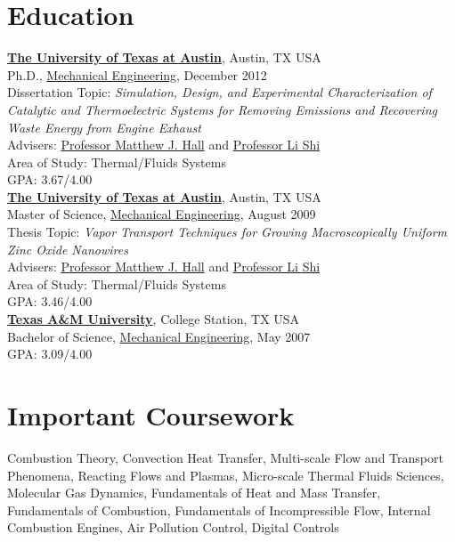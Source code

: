 \documentclass[centered]{res}
\begin{document}
\begin{resume}
\section{Education}
%
\href{http://www.utexas.edu/}{\textbf{The University of Texas at
    Austin}}, Austin, TX USA \\
Ph.D., \href{http://www.me.utexas.edu/}{Mechanical Engineering},
December 2012 \\
Dissertation Topic: \emph{Simulation, Design, and Experimental Characterization of
  Catalytic and Thermoelectric Systems for Removing Emissions and
  Recovering Waste Energy from Engine Exhaust} \\
Advisers:
\href{http://www.me.utexas.edu/directory/faculty/hall/matthew/33/}{Professor
  Matthew J. Hall} and \href{http://www.me.utexas.edu/~lishi/}{Professor Li Shi}\\
Area of Study: Thermal/Fluids Systems \\
GPA: 3.67/4.00 \\
%
\href{http://www.utexas.edu/}{\textbf{The University of Texas at
    Austin}}, Austin, TX USA \\
Master of Science, \href{http://www.me.utexas.edu/}{Mechanical
  Engineering}, August 2009 \\
Thesis Topic: \emph{Vapor Transport Techniques for Growing
  Macroscopically Uniform Zinc Oxide Nanowires} \\
Advisers:
\href{http://www.me.utexas.edu/directory/faculty/hall/matthew/33/}{Professor
  Matthew J. Hall} and \href{http://www.me.utexas.edu/~lishi/}{Professor Li Shi}\\
Area of Study: Thermal/Fluids Systems \\
GPA: 3.46/4.00\\
%
\href{http://www.tamu.edu/}{\textbf{Texas A\&M University}}, College
Station, TX USA \\
Bachelor of Science, \href{http://www.mengr.tamu.edu/}{Mechanical
  Engineering}, May
2007  \\
GPA: 3.09/4.00

\section{Important Coursework}
Combustion Theory, Convection Heat Transfer, Multi-scale Flow and
Transport Phenomena, Reacting Flows and Plasmas, Micro-scale Thermal
Fluids Sciences, Molecular Gas Dynamics, Fundamentals of Heat and Mass
Transfer, Fundamentals of Combustion, Fundamentals of Incompressible
Flow, Internal Combustion Engines, Air Pollution Control, Digital Controls
 

\end{resume}
\end{document}
